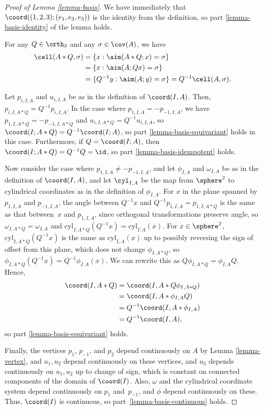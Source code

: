 \begin{proof}[Proof of Lemma \ref{lemma-basis}]
We have immediately that $\coord((1,2,3);(e_1,e_3,e_3))$ is the identity from the definition, so part \eqref{lemma-basis-identity} of the lemma holds.

For any $Q \in \orth_3$ and any $\sigma \in \cov(A)$, we have
\begin{align*}
\cell(A*Q, \sigma) &= \{x : \aim(A*Q;x) = \sigma\} \\
&= \{x : \aim(A;Qx) = \sigma\} \\
&= \{Q^{-1}y : \aim(A;y) = \sigma\}
= Q^{-1}\cell(A,\sigma).
\end{align*}

Let $p_{i,I,A}$ and $u_{i,I,A}$ be as in the definition of $\coord(I,A)$.
Then, $p_{i,I,A*Q} = Q^{-1}p_{i,I,A}$.
In the case where $p_{1,I,A} = -p_{-1,I,A}$, we have $p_{1,I,A*Q} = -p_{-1,I,A*Q}$ and $u_{i,I,A*Q} = Q^{-1} u_{i,I,A}$, so $\coord(I;A*Q) = Q^{-1}\coord(I;A)$, so part \eqref{lemma-basis-equivariant} holds in this case.
Furthermore, if $Q = \coord(I;A)$, then $\coord(I;A*Q) =Q^{-1}Q=\id$, so part \eqref{lemma-basis-idempotent} holds.

Now consider the case where $p_{1,I,A} \neq -p_{-1,I,A}$, and let $\phi_{I,A}$ and $\omega_{I,A}$
be as in the definition of $\coord(I,A)$,
and let $\cyl_{I,A}$ be the map from $\sphere^2$ to cylindrical coordinates as in the definition of $\phi_{I,A}$.
For $x$ in the plane spanned by $p_{1,I,A}$ and $p_{-1,I,A}$,
the angle between $Q^{-1}x$ and $Q^{-1}p_{1,I,A}= p_{1,I,A*Q}$ is the same as that between~$x$ and $p_{1,I,A}$, since orthogonal transformations preserve angle,
so $\omega_{I,A*Q} = \omega_{I,A}$ and $\mathrm{cyl}_{I,A*Q}(Q^{-1}x) = \mathrm{cyl}_{I,A}(x)$.
For $x \in \sphere^2$, $\mathrm{cyl}_{I,A*Q}(Q^{-1}x)$ is the same as $\mathrm{cyl}_{I,A}(x)$ up to possibly reversing the sign of offset from this plane, which does not change $\phi_{I,A*Q}$, so $\phi_{I,A*Q}(Q^{-1}x) = Q^{-1}\phi_{I,A}(x)$. We can rewrite this as $Q\phi_{I,A*Q} = \phi_{I,A}Q$.
Hence,
\begin{align*}
\coord(I,A*Q) &= \coord(I,A*Q \phi_{I,A*Q}) \\
& = \coord(I,A*\phi_{I,A}Q) \\
& = Q^{-1} \coord(I,A*\phi_{I,A}) \\
& = Q^{-1} \coord(I,A),
\end{align*}
so part \eqref{lemma-basis-equivariant} holds.

Finally, the vertices $p_{1}$, $p_{-1}$, and $p_{2}$ depend continuously on $A$ by Lemma \ref{lemma-vertex}, and $u_1,u_2$ depend continuously on these vertices, and $u_3$ depends continuously on $u_1,u_2$ up to change of sign, which is constant on connected components of the domain of $\coord(I)$.
Also, $\omega$ and the cylindrical coordinate system depend continuously on $p_{1}$ and~$p_{-1}$, and $\phi$ depend continuously on these.
Thus, $\coord(I)$ is continuous, so part~\eqref{lemma-basis-continuous} holds.
\end{proof}

